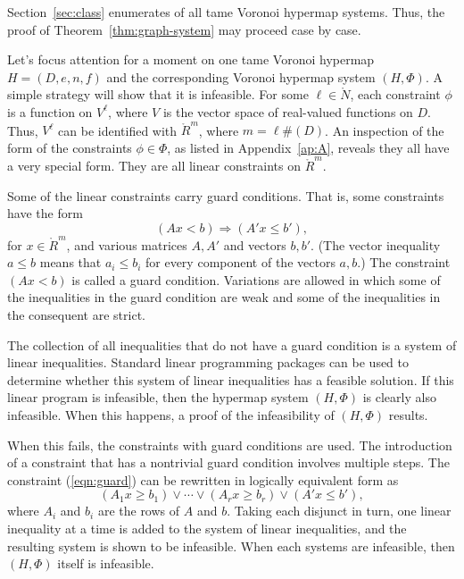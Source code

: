\documentclass{article} %
\begin{document}
Section~\ref{sec:class} enumerates of all tame Voronoi
hypermap systems.  Thus, the proof of
Theorem~\ref{thm:graph-system} may proceed case by case.


Let's focus attention for a moment on one tame Voronoi hypermap $H=(D,e,n,f)$ and the corresponding Voronoi hypermap system $(H,\Phi)$.
A simple strategy will show that it is infeasible.
For some $\ell\in\ring{N}$,
each constraint $\phi$ is a function on $V^\ell$, where $V$ is
the vector space of real-valued functions on $D$.  Thus,
$V^\ell$ can be identified with $\ring{R}^m$, where $m= \ell \#(D)$.
An inspection of the form of the constraints $\phi\in \Phi$, as listed
in Appendix~\ref{ap:A}, reveals they all have a 
very special form.  They are all linear constraints
on $\ring{R}^m$.  

Some of the linear constraints
carry guard conditions.  That is, some constraints have the form
  \begin{equation}\label{eqn:guard}
  (A x < b)  \Rightarrow (A' x \le b'),
  \end{equation}
for $x\in\ring{R}^m$, and various matrices $A,A'$ and vectors
$b,b'$.  (The vector inequality $a \le b$ means
that $a_i\le b_i$ for every component of the vectors $a,b$.)
The constraint $(A x < b)$ is called a guard condition.
Variations are allowed in which some of the inequalities in the
guard condition are weak and some of the inequalities in the
consequent are strict.

The collection of all inequalities that do not have a guard 
condition is a system of linear inequalities.  Standard linear
programming packages can be used to determine whether this
system of linear inequalities has a feasible solution.  If this
linear program is infeasible, then the hypermap system $(H,\Phi)$
is clearly also infeasible.  When this happens, a
proof of the infeasibility of $(H,\Phi)$ results.

When this fails, the constraints with guard conditions are
used.
The introduction of a constraint that has a nontrivial guard condition
involves multiple steps.  
The constraint (\ref{eqn:guard}) can be rewritten in logically
equivalent form as
  $$
   (A_{1} x \ge b_{1}) \lor \cdots \lor
   (A_{r} x \ge b_{r}) \lor (A' x \le b'),
  $$
where $A_{i}$ and $b_{i}$ are the rows of $A$ and $b$.
Taking each disjunct in turn, one linear inequality at a time
is added to the system
of linear inequalities, and the resulting system is shown to be
infeasible.  When each
systems are infeasible, then $(H,\Phi)$ itself is infeasible.
\end{document}
